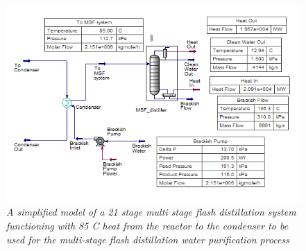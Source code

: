 \documentclass[12pt]{UIdahoMastersThesis}
\begin{document}
\begin{figure}
\includegraphics[width=\textwidth]{85MSF.PNG}
\caption{\small \sl A simplified model of a 21 stage multi stage flash distillation system functioning with 85 \degree C heat from the reactor to the condenser to be used for the multi-stage flash distillation water purification process}
\end{figure}
\end{document}
